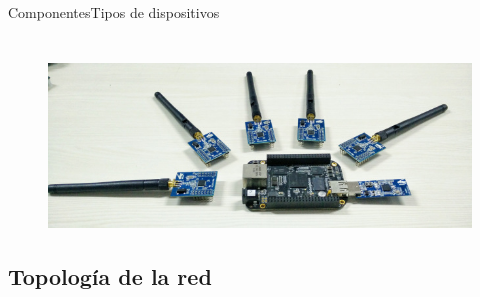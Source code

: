 \documentclass[aspectratio=169, handout]{beamer}
\begin{document}
\begin{frame}{Componentes}{Tipos de dispositivos}
\begin{minipage}[c]{1.0\linewidth}
\begin{minipage}[c]{0.5\linewidth}
\begin{figure}
\begin{align*}
				\end{align*}\\
				\vspace{15px}
				{\includegraphics[width=.6\textwidth]{./imagenes/FFDvsRFD}}
			
		\end{figure}	  	  	  	
	\end{minipage}	
\end{minipage}
\end{frame}

\subsection[Topología]{Topología de la red}
\end{document}

